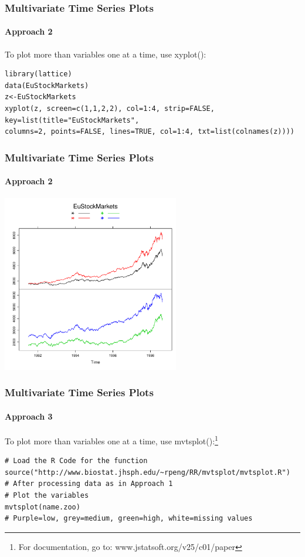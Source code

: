 \begin{frame}[fragile]
 \frametitle{Multivariate Time Series Plots}
 \framesubtitle{Approach 2}

To plot more than variables one at a time, use \ttfamily xyplot()\normalfont :
		\begin{lstlisting}
library(lattice)
data(EuStockMarkets)
z<-EuStockMarkets
xyplot(z, screen=c(1,1,2,2), col=1:4, strip=FALSE, key=list(title="EuStockMarkets", 
columns=2, points=FALSE, lines=TRUE, col=1:4, txt=list(colnames(z))))
		\end{lstlisting}
\end{frame}

\begin{frame}[fragile]
 \frametitle{Multivariate Time Series Plots}
 \framesubtitle{Approach 2}

       \begin{center}
         \includegraphics[width=0.58\textwidth]{images/xyplotLattice.pdf}
        \end{center}
\end{frame}



\begin{frame}[fragile]
 \frametitle{Multivariate Time Series Plots}
 \framesubtitle{Approach 3}

To plot more than variables one at a time, use \ttfamily mvtsplot()\normalfont :\footnote{For documentation, go to: www.jstatsoft.org/v25/c01/paper}
		\begin{lstlisting}
# Load the R Code for the function
source("http://www.biostat.jhsph.edu/~rpeng/RR/mvtsplot/mvtsplot.R")		
# After processing data as in Approach 1
# Plot the variables
mvtsplot(name.zoo)
# Purple=low, grey=medium, green=high, white=missing values
		\end{lstlisting}
\end{frame}

